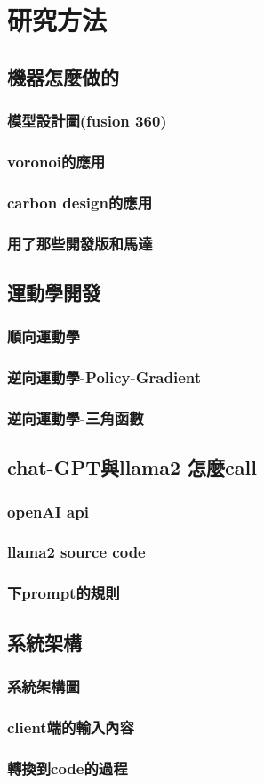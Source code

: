 \documentclass[class=NCU_thesis, crop=false]{standalone}
\begin{document}
\chapter{研究方法}

\section{機器怎麼做的}
\subsection{模型設計圖(fusion 360)}
\subsection{voronoi的應用}
\subsection{carbon design的應用}
\subsection{用了那些開發版和馬達}

\section{運動學開發}
\subsection{順向運動學}
\subsection{逆向運動學-Policy-Gradient}
\subsection{逆向運動學-三角函數}

\section{chat-GPT與llama2 怎麼call}
\subsection{openAI api}
\subsection{llama2 source code}
\subsection{下prompt的規則}

\section{系統架構}
\subsection{系統架構圖}
\subsection{client端的輸入內容}
\subsection{轉換到code的過程}
\end{document}
